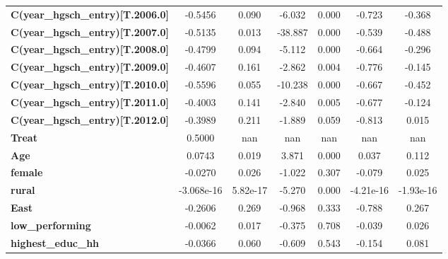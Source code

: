 \begin{center}
\begin{tabular}{lcccccc}
\textbf{C(year\_hgsch\_entry)[T.2006.0]} &      -0.5456  &        0.090     &    -6.032  &         0.000        &       -0.723    &       -0.368     \\
\textbf{C(year\_hgsch\_entry)[T.2007.0]} &      -0.5135  &        0.013     &   -38.887  &         0.000        &       -0.539    &       -0.488     \\
\textbf{C(year\_hgsch\_entry)[T.2008.0]} &      -0.4799  &        0.094     &    -5.112  &         0.000        &       -0.664    &       -0.296     \\
\textbf{C(year\_hgsch\_entry)[T.2009.0]} &      -0.4607  &        0.161     &    -2.862  &         0.004        &       -0.776    &       -0.145     \\
\textbf{C(year\_hgsch\_entry)[T.2010.0]} &      -0.5596  &        0.055     &   -10.238  &         0.000        &       -0.667    &       -0.452     \\
\textbf{C(year\_hgsch\_entry)[T.2011.0]} &      -0.4003  &        0.141     &    -2.840  &         0.005        &       -0.677    &       -0.124     \\
\textbf{C(year\_hgsch\_entry)[T.2012.0]} &      -0.3989  &        0.211     &    -1.889  &         0.059        &       -0.813    &        0.015     \\
\textbf{Treat}                           &       0.5000  &          nan     &       nan  &           nan        &          nan    &          nan     \\
\textbf{Age}                             &       0.0743  &        0.019     &     3.871  &         0.000        &        0.037    &        0.112     \\
\textbf{female}                          &      -0.0270  &        0.026     &    -1.022  &         0.307        &       -0.079    &        0.025     \\
\textbf{rural}                           &   -3.068e-16  &     5.82e-17     &    -5.270  &         0.000        &    -4.21e-16    &    -1.93e-16     \\
\textbf{East}                            &      -0.2606  &        0.269     &    -0.968  &         0.333        &       -0.788    &        0.267     \\
\textbf{low\_performing}                 &      -0.0062  &        0.017     &    -0.375  &         0.708        &       -0.039    &        0.026     \\
\textbf{highest\_educ\_hh}               &      -0.0366  &        0.060     &    -0.609  &         0.543        &       -0.154    &        0.081     \\

\end{tabular}
\end{center}
